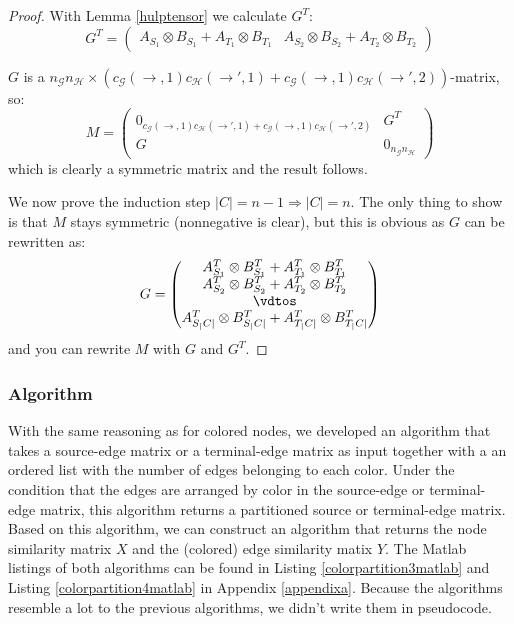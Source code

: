 \documentclass[a4paper,11pt]{report}
\newcommand{\graf}{\mathscr{G}}
\newcommand{\grafeen}{\mathscr{H}}
\begin{document}
\begin{proof}
With Lemma \ref{hulptensor} we calculate $G^T$:
$$G^T = \begin{pmatrix}
A_{S_1} \otimes  B_{S_1} + A_{T_1} \otimes B_{T_1} &
A_{S_2} \otimes  B_{S_2} + A_{T_2} \otimes B_{T_2}
\end{pmatrix}$$

$G$ is a $n_\graf n_\grafeen \times (c_\graf(\to,1)c_\grafeen(\to',1)+c_\graf(\to,1)c_\grafeen(\to',2))$-matrix, so:
$$ M = \begin{pmatrix}
0_{c_\graf(\to,1)c_\grafeen(\to',1)+c_\graf(\to,1)c_\grafeen(\to',2)}& G^T\\
G & 0_{n_\graf n_\grafeen}
\end{pmatrix}$$
which is clearly a symmetric matrix and the result follows.

We now prove the induction step $|C|=n-1 \Rightarrow |C|=n$. The only thing to 
show is that $M$ stays symmetric (nonnegative is clear), but this is obvious as $G$ can be rewritten 
as:
$$G = \begin{pmatrix}
A^T_{S_1} \otimes  B^T_{S_1} + A^T_{T_1} \otimes B^T_{T_1}\\
A^T_{S_2} \otimes  B^T_{S_2} + A^T_{T_2} \otimes B^T_{T_2}\\
\vdtos\\
A^T_{S_|C|} \otimes  B^T_{S_|C|} + A^T_{T_|C|} \otimes B^T_{T_|C|}
\end{pmatrix}$$
and you can rewrite $M$ with $G$ and $G^T$.



\end{proof}
\subsubsection{Algorithm}
With the same reasoning as for colored nodes, we developed an algorithm that 
takes a source-edge matrix or a terminal-edge matrix as input together with a 
an ordered list with the number of edges belonging to each color. Under the 
condition that the edges are arranged by color in the source-edge or 
terminal-edge matrix, this algorithm returns a partitioned source or terminal-edge 
matrix. Based on this algorithm, we can construct an algorithm that returns the 
node similarity matrix $X$ and the (colored) edge similarity matix $Y$. The 
Matlab
listings of both algorithms can be found in Listing \ref{colorpartition3matlab} 
and Listing \ref{colorpartition4matlab} in Appendix \ref{appendixa}. Because the 
algorithms resemble a lot to the previous algorithms, we didn't write them in 
pseudocode.
\end{document}
